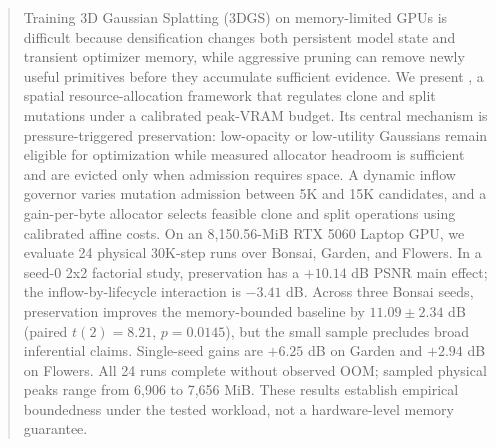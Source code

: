 \begin{abstract}
Training 3D Gaussian Splatting (3DGS) on memory-limited GPUs is difficult because densification changes both persistent model state and transient optimizer memory, while aggressive pruning can remove newly useful primitives before they accumulate sufficient evidence. We present \method, a spatial resource-allocation framework that regulates clone and split mutations under a calibrated peak-VRAM budget. Its central mechanism is pressure-triggered preservation: low-opacity or low-utility Gaussians remain eligible for optimization while measured allocator headroom is sufficient and are evicted only when admission requires space. A dynamic inflow governor varies mutation admission between 5K and 15K candidates, and a gain-per-byte allocator selects feasible clone and split operations using calibrated affine costs. On an 8,150.56-MiB RTX 5060 Laptop GPU, we evaluate 24 physical 30K-step runs over Bonsai, Garden, and Flowers. In a seed-0 2x2 factorial study, preservation has a $+10.14$ dB PSNR main effect; the inflow-by-lifecycle interaction is $-3.41$ dB. Across three Bonsai seeds, preservation improves the memory-bounded baseline by $11.09\pm2.34$ dB (paired $t(2)=8.21$, $p=0.0145$), but the small sample precludes broad inferential claims. Single-seed gains are $+6.25$ dB on Garden and $+2.94$ dB on Flowers. All 24 runs complete without observed OOM; sampled physical peaks range from 6,906 to 7,656 MiB. These results establish empirical boundedness under the tested workload, not a hardware-level memory guarantee.
\end{abstract}
